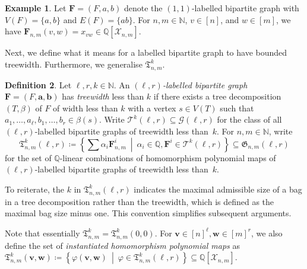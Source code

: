 \documentclass[10pt,a4paper]{article}
\theoremstyle{definition}
\newtheorem{definition}{Definition}[section]
\newtheorem{example}[definition]{Example}
\theoremstyle{plain}
\theoremstyle{remark}
\renewcommand{\phi}{\varphi}
\begin{document}
	\begin{example}\label{ex:edge}
		Let $\boldsymbol{F} = (F, a, b)$ denote the $(1,1)$-labelled bipartite graph with $V(F) = \{a,b\}$ and $E(F) = \{ab\}$.
		For $n,m \in \mathbb{N}$, $v \in [n]$, and $w \in [m]$,
		we have $\boldsymbol{F}_{n,m}(v, w) = x_{vw} \in \mathbb{Q}[\mathcal{X}_{n,m}]$.
	\end{example}
	
	Next, we define what it means for a labelled bipartite graph to have bounded treewidth.
	Furthermore, we generalise $\mathfrak{T}^k_{n,m}$.


	\begin{definition}\label{def:treewidth-labelled}
		Let $\ell, r, k \in \mathbb{N}$.
		An \emph{$(\ell, r)$-labelled bipartite graph} $\boldsymbol{F} = (F, \boldsymbol{a}, \boldsymbol{b})$ has \emph{treewidth} less than $k$ if there exists a tree decomposition $(T, \beta)$ of $F$ of width less than $k$ with a vertex $s \in V(T)$ such that $a_1, \dots, a_\ell, b_1, \dots, b_r \in \beta(s)$.
		Write $\mathcal{T}^k(\ell, r) \subseteq \mathcal{G}(\ell, r)$ for the class of all $(\ell, r)$-labelled bipartite graphs of treewidth less than~$k$.
		For $n,m \in \mathbb{N}$, write
		\[
			\mathfrak{T}_{n,m}^k(\ell, r) \coloneqq \left\{\sum \alpha_i \boldsymbol{F}^i_{n,m} \ \middle|\  \alpha_i \in \mathbb{Q}, \boldsymbol{F}^i \in \mathcal{T}^k(\ell, r)\right\}
			\subseteq \mathfrak{G}_{n,m}(\ell, r)
		\]
		for the set of $\mathbb{Q}$-linear combinations of homomorphism polynomial maps of $(\ell,r)$-labelled bipartite graphs of treewidth less than~$k$.
	\end{definition}
	
	To reiterate, the $k$ in $\mathfrak{T}_{n,m}^k(\ell, r)$ indicates the maximal admissible size of a bag in a tree decomposition rather than the treewidth, which is defined as the maximal bag size minus one.
	This convention simplifies subsequent arguments.
	


	Note that essentially $\mathfrak{T}^k_{n,m} = \mathfrak{T}^k_{n,m}(0,0)$. For $\boldsymbol{v} \in [n]^\ell, \boldsymbol{w} \in [m]^r$, we also define the set of \emph{instantiated homomorphism polynomial maps} as  
	\(
	\mathfrak{T}_{n,m}^k(\boldsymbol{v},\boldsymbol{w}) \coloneqq \left\{ \phi(\boldsymbol{v}, \boldsymbol{w}) \ \middle|\  \phi \in \mathfrak{T}^k_{n,m}(\ell,r) \right\} \subseteq \mathbb{Q}[\mathcal{X}_{n,m}].
	\)
	
	
\end{document}
